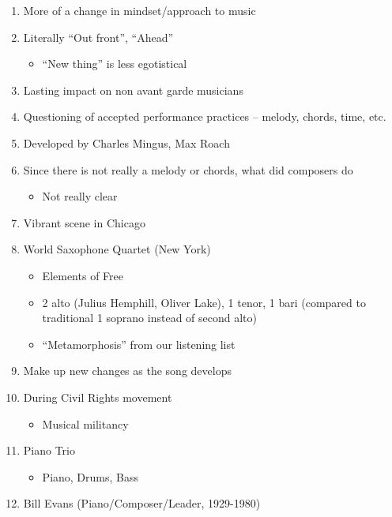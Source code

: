 \documentclass[]{article}
\providecommand{\tightlist}{%
  \setlength{\itemsep}{0pt}\setlength{\parskip}{0pt}}
\begin{document}
\begin{enumerate}
\def\labelenumi{\arabic{enumi}.}
\tightlist
\item
  More of a change in mindset/approach to music
\item
  Literally ``Out front'', ``Ahead''

  \begin{itemize}
  \tightlist
  \item
    ``New thing'' is less egotistical
  \end{itemize}
\item
  Lasting impact on non avant garde musicians
\item
  Questioning of accepted performance practices -- melody, chords, time,
  etc.
\item
  Developed by Charles Mingus, Max Roach
\item
  Since there is not really a melody or chords, what did composers do

  \begin{itemize}
  \tightlist
  \item
    Not really clear
  \end{itemize}
\item
  Vibrant scene in Chicago
\item
  World Saxophone Quartet (New York)

  \begin{itemize}
  \tightlist
  \item
    Elements of Free
  \item
    2 alto (Julius Hemphill, Oliver Lake), 1 tenor, 1 bari (compared to
    traditional 1 soprano instead of second alto)
  \item
    ``Metamorphosis'' from our listening list
  \end{itemize}
\item
  Make up new changes as the song develops
\item
  During Civil Rights movement

  \begin{itemize}
  \tightlist
  \item
    Musical militancy
  \end{itemize}
\item
  Piano Trio

  \begin{itemize}
  \tightlist
  \item
    Piano, Drums, Bass
  \end{itemize}
\item
  Bill Evans (Piano/Composer/Leader, 1929-1980)


\end{enumerate}
\end{document}
